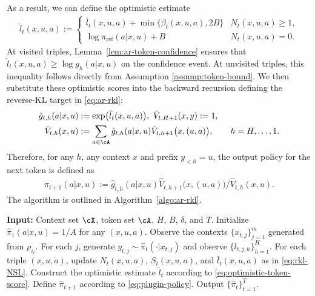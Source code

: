 \documentclass[11pt]{article}
\newcommand{\piref}{\pi_{\text{ref}}}
\begin{document}
As a result, we can define the optimistic estimate
\begin{align}
    \hat l_t(x,u,a)
    := \begin{cases}
        \bar l_t(x,u,a) + \min \big\{\beta_t(x,u,a), 2B\big\}& N_t(x,u,a) \ge 1,\\
         \log \piref(a|x,u) + B & N_t(x,u,a) = 0.
        \end{cases}
    \label{eq:optimistic-token-score}
\end{align}
At visited triples, Lemma~\ref{lem:ar-token-confidence} ensures that $\hat l_t(x,u,a)\geq\log g_h(a|x,u)$ on the confidence event. At unvisited triples, this inequality follows directly from Assumption \ref{assump:token-bound}. We then substitute these optimistic scores into the backward recursion defining the reverse-KL target in \eqref{eq:ar-rkl}:
\begin{align}
    \hat g_{t,h}(a|x,u)
    &:=
    \exp\bigl(\hat l_t(x,u,a)\bigr), \
    \hat V_{t,H+1}(x,y)
    :=
    1,\notag\\
    \hat V_{t,h}(x,u)
    &:=
    \sum_{a\in\cA}
    \hat g_{t,h}(a|x,u)
    \hat V_{t,h+1}\bigl(x,(u,a)\bigr),
    \qquad h=H,\ldots,1.
\notag
\end{align}
Therefore, for any $h$, any context $x$ and prefix $y_{<h} = u$, the output policy for the next token is defined as
\begin{align}
    \hat\pi_{t+1}(a|x,u)
    :=
    {
        \hat g_{t,h}(a|x,u)
        \hat V_{t,h+1}\bigl(x,(u,a)\bigr)
    }/{
        \hat V_{t,h}(x,u)
    }.
    \label{eq:plugin-policy}
\end{align}
The algorithm is outlined in Algorithm~\ref{algo:ar-rkl}.
\begin{algorithm}[H]
\caption{Per-Prefix Reverse KL}
\label{algo:ar-rkl}
\begin{algorithmic}[1]
    \STATE \textbf{Input:} Context set $\cX$, token set $\cA$, $H$, $B$, $\delta$, and $T$.
    \STATE Initialize 
    $\hat\pi_1(a|x,u)=1/A$ for any $(x,u,a)$.
        \STATE Observe the contexts
        $\{x_{t,j}\}_{j=1}^m$ generated from $\rho_{i_t}$.
        \STATE For each $j$, generate $y_{t,j}\sim\hat\pi_t(\cdot|x_{t,j})$
        and observe $\{l_{t,j,h}\}_{h=1}^H$.
        \STATE For each triple $(x,u,a)$, update $N_t(x,u,a)$, $S_t(x,u,a)$, and $\bar l_t(x,u,a)$ as in \eqref{eq:rkl-NSL}.
        \STATE Construct the optimistic estimate $\hat l_t$ according to
        \eqref{eq:optimistic-token-score}.
        \STATE Define $\hat\pi_{t+1}$ according to
        \eqref{eq:plugin-policy}.
    \ENDFOR
    \STATE Output $\{\hat\pi_t\}_{t=1}^T$.
\end{algorithmic}
\end{algorithm}
\end{document}
